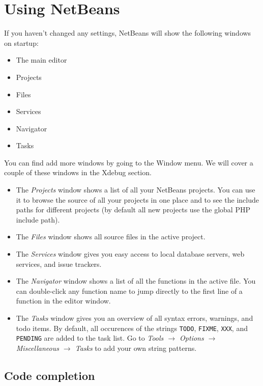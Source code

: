 \documentclass[final,ebook,10pt,twoside,openright]{memoir}
\begin{document}
\chapter{Using NetBeans} %
\label{cha:Using NetBeans}
\chapterprecis{}

If you haven’t changed any settings, NetBeans will show the following windows on startup:


\begin{itemize}
\item The main editor
\item Projects
\item Files
\item Services
\item Navigator
\item Tasks
\end{itemize}

You can find add more windows by going to the Window menu. We will cover a couple of these windows in the Xdebug section.

\begin{itemize}
\item The \emph{Projects} window shows a list of all your NetBeans projects. You can use it to browse the source of all your projects in one place and to see the include paths for different projects (by default all new projects use the global PHP include path).
\item The \emph{Files} window shows all source files in the active project.
\item The \emph{Services} window gives you easy access to local database servers, web services, and issue trackers.
\item The \emph{Navigator} window shows a list of all the functions in the active file. You can double-click any function name to jump directly to the first line of a function in the editor window.
\item The \emph{Tasks} window gives you an overview of all syntax errors, warnings, and todo items. By default, all occurences of the strings \verb!TODO!, \verb!FIXME!, \verb!XXX!, and \verb!PENDING! are added to the task list. Go to \emph{Tools $\rightarrow$ Options $\rightarrow$ Miscellaneous $\rightarrow$ Tasks} to add your own string patterns.
\end{itemize}

\section{Code completion}
\end{document}
